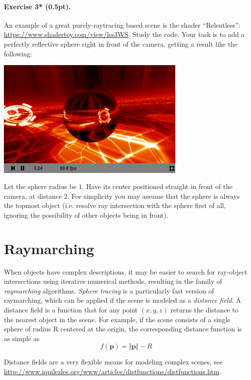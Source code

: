 \documentclass{article}
\newenvironment{exercise}[2]{\paragraph{Exercise #1 (#2pt).} }{
\medskip}
\newcommand{\bp}{\mathbf{p}}
\begin{document}
\begin{exercise}{3*}{0.5}
An example of a great purely-raytracing based scene is the shader ``Relentless'': \url{https://www.shadertoy.com/view/lss3WS}. Study the code. Your task is to add a perfectly reflective sphere right in front of the camera, getting a result like the following:
\begin{center}
\includegraphics[width=0.7\textwidth]{relentless.png}
\end{center}
Let the sphere radius be $1$. Have its center positioned straight in front of the camera, at distance $2$. For simplicity you may assume that the sphere is always the topmost object (i.e. resolve ray intersection with the sphere first of all, ignoring the possibility of other objects being in front).
\end{exercise}

\section{Raymarching}
When objects have complex descriptions, it may be easier to search for ray-object intersections using iterative numerical methods, resulting in the family of \emph{raymarching} algorithms. \emph{Sphere tracing} is a particularly fast version of raymarching, which can be applied if the scene is modeled as a \emph{distance field}. A distance field is a function that for any point $(x, y, z)$ returns the distance to the nearest object in the scene. For example, if the scene consists of a single sphere of radius R centered at the origin, the corresponding distance function is as simple as
$$
f(\bp) = \Vert \bp \Vert - R
$$

Distance fields are a very flexible means for modeling complex scenes, see \url{http://www.iquilezles.org/www/articles/distfunctions/distfunctions.htm}.
\end{document}

